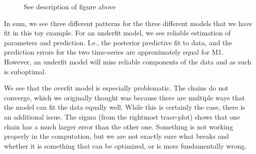 \documentclass{article}
\begin{document}
\begin{figure}[H]
    \centering
    \quad
    \quad
    \caption{See description of figure above}
\end{figure}

In sum, we see three different patterns for the three different models that we have fit in this toy example. For an underfit model, we see reliable estimation of parameters and prediction. I.e., the posterior predictive fit to data, and the prediction errors for the two time-series are approximately equal for M1. However, an underfit model will miss reliable components of the data and as such is suboptimal. 

We see that the overfit model is especially problematic. The chains do not converge, which we originally thought was because there are multiple ways that the model can fit the data equally well. While this is certainly the case, there is an additional issue. The sigma (from the rightmost trace-plot) shows that one chain has a much larger error than the other one. Something is not working properly in the computation, but we are not exactly sure what breaks and whether it is something that can be optimized, or is more fundamentally wrong. 
\end{document}
